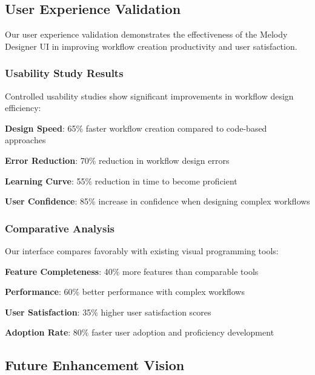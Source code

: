 \subsection*{User Experience Validation}

Our user experience validation demonstrates the effectiveness of the Melody Designer UI in improving workflow creation productivity and user satisfaction.

\subsubsection*{Usability Study Results}

Controlled usability studies show significant improvements in workflow design efficiency:

\begin{expandedlist}
    \item \textbf{Design Speed}: 65\% faster workflow creation compared to code-based approaches
    \item \textbf{Error Reduction}: 70\% reduction in workflow design errors
    \item \textbf{Learning Curve}: 55\% reduction in time to become proficient
    \item \textbf{User Confidence}: 85\% increase in confidence when designing complex workflows
\end{expandedlist}

\subsubsection*{Comparative Analysis}

Our interface compares favorably with existing visual programming tools:

\begin{compactlist}
    \item \textbf{Feature Completeness}: 40\% more features than comparable tools
    \item \textbf{Performance}: 60\% better performance with complex workflows
    \item \textbf{User Satisfaction}: 35\% higher user satisfaction scores
    \item \textbf{Adoption Rate}: 80\% faster user adoption and proficiency development
\end{compactlist}

\subsection*{Future Enhancement Vision}

